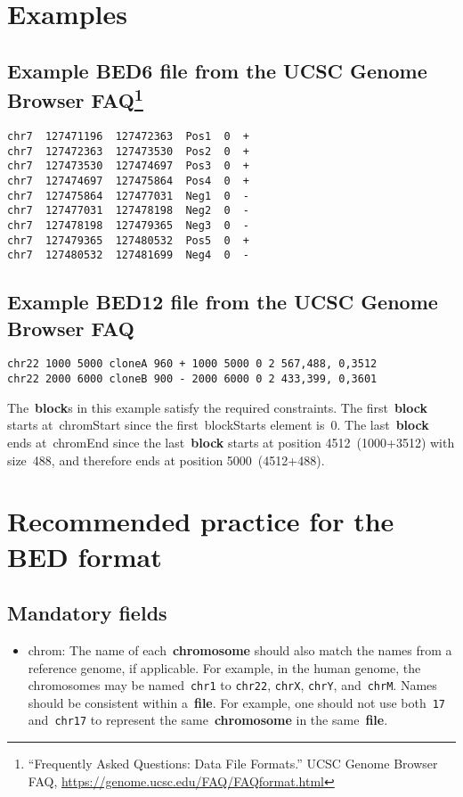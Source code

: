 \documentclass[11pt]{article}
\begin{document}
\section{Examples}

\subsection[title]{Example BED6 file from the \acs{UCSC} Genome Browser FAQ\footnote{``Frequently
    Asked Questions: Data File Formats.'' \ac{UCSC} Genome Browser FAQ,
    \url{https://genome.ucsc.edu/FAQ/FAQformat.html}}}\label{sec:example-bed6}

\begin{verbatim}
chr7  127471196  127472363  Pos1  0  +
chr7  127472363  127473530  Pos2  0  +
chr7  127473530  127474697  Pos3  0  +
chr7  127474697  127475864  Pos4  0  +
chr7  127475864  127477031  Neg1  0  -
chr7  127477031  127478198  Neg2  0  -
chr7  127478198  127479365  Neg3  0  -
chr7  127479365  127480532  Pos5  0  +
chr7  127480532  127481699  Neg4  0  -
\end{verbatim}

\subsection{Example BED12 file from the \acs{UCSC} Genome Browser FAQ}
\begin{verbatim}
chr22 1000 5000 cloneA 960 + 1000 5000 0 2 567,488, 0,3512
chr22 2000 6000 cloneB 900 - 2000 6000 0 2 433,399, 0,3601
\end{verbatim}

The~\textbf{block}s in this example satisfy the required constraints.
The first~\textbf{block} starts at~\textsf{chromStart} since the first~\textsf{blockStarts} element is~0.
The last~\textbf{block} ends at~\textsf{chromEnd} since the last~\textbf{block} starts at position 4512~(1000+3512) with size~488, and therefore ends at position 5000~(4512+488).

\section{Recommended practice for the \acs{BED} format}

\subsection{Mandatory fields}
\begin{itemize}
\item \textsf{chrom}: The name of each~\textbf{chromosome} should also match the names from a reference genome, if applicable.
  For example, in the human genome, the chromosomes may be named~\texttt{chr1} to \texttt{chr22}, \texttt{chrX}, \texttt{chrY}, and~\texttt{chrM}.
  Names should be consistent within a~\textbf{file}.
  For example, one should not use both~\texttt{17} and~\texttt{chr17} to represent the same~\textbf{chromosome} in the same~\textbf{file}.
\end{itemize}
\end{document}
